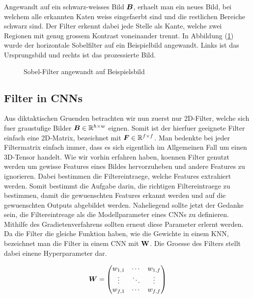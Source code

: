 Angewandt auf ein schwarz-weisses Bild $\bm{B}$, erhaelt man ein neues Bild, bei welchem alle erkannten
Katen weiss eingefaerbt sind und die restlichen Bereiche schwarz sind.
Der Filter erkennt dabei jede Stelle als Kante, welche zwei Regionen mit
genug grossem Kontrast voneinander trennt.
In Abbildung (\ref{fig:sobel_filter}) wurde der horizontale Sobelfilter auf ein
Beispielbild angewandt. Links ist das Ursprungsbild und rechts ist das
prozessierte Bild.


\begin{figure}[h!]

  \caption{Sobel-Filter angewandt auf Beispielsbild}
  \label{fig:sobel_filter}
\end{figure}

\para{}
\cite{wiki:sobel_operator}
\cite{deeplearning.ai:cnn}
\cite{wiki:kernel}


\subsection{Filter in CNNs}
Aus diktaktischen Gruenden betrachten wir nun zuerst
nur 2D-Filter, welche sich fuer graustufige Bilder
$\bm{B} \in \mathbb{R}^{h \times w}$ eignen. Somit ist der hierfuer geeignete
Filter einfach eine 2D-Matrix, bezeichnet mit $\bm{F} \in \mathbb{R}^{f \times
  f}$. Man bedenkte bei jeder Filtermatrix einfach immer, dass es sich
eigentlich im Allgemeinen Fall um einen 3D-Tensor handelt.
\para{}
Wie wir vorhin erfahren haben, koennen Filter genutzt werden um gewisse
Features eines Bildes hervorzuheben und andere Features zu ignorieren. Dabei
bestimmen die Filtereintraege, welche Features extrahiert werden. Somit bestimmt
die Aufgabe darin, die richtigen Filtereintraege zu bestimmen, damit die
gewuenschten Features erkannt werden und auf die gewuenschten Outputs abgebildet
werden. Naheliegend sollte jetzt der Gedanke sein, die Filtereintreage als die
Modellparameter eines CNNs zu definieren.
Mithilfe des Gradietenverfahrens sollten erneut diese Parameter
erlernt werden. \\
Da die Filter die gleiche Funktion haben, wie die Gewichte in einem KNN,
bezeichnet man die Filter in einem CNN mit $\mathbf{W}$. Die Groesse des Filters
stellt dabei einene Hyperparameter dar.

\begin{equation*}
  \bm{W} = \begin{pmatrix}
    w_{1,1} & \cdots & w_{1,f} \\
    \vdots & \ddots & \vdots \\
    w_{f,1} & \cdots & w_{f,f}
  \end{pmatrix}
\end{equation*}


